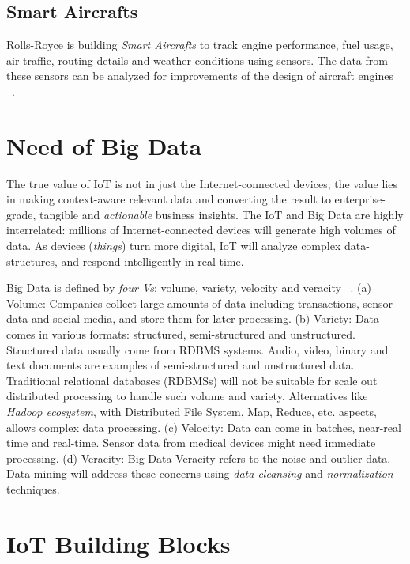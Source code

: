 \documentclass[sigconf]{acmart}
\begin{document}
	\subsection{Smart Aircrafts}
	
	Rolls-Royce is building {\em Smart Aircrafts} to track engine performance, fuel usage, air traffic, routing details and weather conditions using sensors. The data from these sensors can be analyzed for improvements of the design of aircraft engines ~\cite{smart-aircraft}.	

	\section{Need of Big Data}
	
	The true value of IoT is not in just the Internet-connected devices; the value lies in making context-aware relevant data and converting the result to enterprise-grade, tangible and {\em actionable} business insights. The IoT and Big Data are highly interrelated: millions of Internet-connected devices will generate high volumes of data. As devices ({\em things}) turn more digital, IoT will analyze complex data-structures, and respond intelligently in real time. 
	
	Big Data is defined by {\em four Vs}: volume, variety, velocity and veracity ~\cite{big-data}. (a) Volume: Companies collect large amounts of data including transactions, sensor data and social media, and store them for later processing. (b) Variety: Data comes in various formats: structured, semi-structured and unstructured. Structured data usually come from RDBMS systems. Audio, video, binary and text documents are examples of semi-structured and unstructured data. Traditional relational databases (RDBMSs) will not be suitable for scale out distributed processing to handle such volume and variety. Alternatives like {\em Hadoop ecosystem}, with Distributed File System, Map, Reduce, etc. aspects, allows complex data processing. (c) Velocity: Data can come in batches, near-real time and real-time. Sensor data from medical devices might need immediate processing. (d) Veracity: Big Data Veracity refers to the noise and outlier data. Data mining will address these concerns using {\em data cleansing} and {\em normalization} techniques.
	

	\section{IoT Building Blocks}
	
\end{document}
